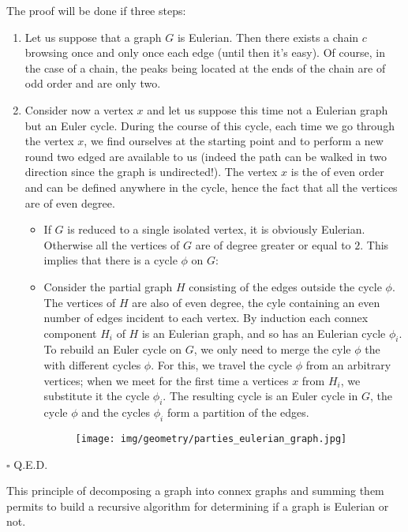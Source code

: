 {\begin{enumerate}
	\pagebreak
	\begin{dem}
	The proof will be done if three steps:
	\begin{enumerate}
		\item Let us suppose that a graph $G$ is Eulerian. Then there exists a chain $c$ browsing once and only once each edge (until then it's easy). Of course, in the case of a chain, the peaks being located at the ends of the chain are of odd order and are only two.
		
		\item Consider now a vertex $x$ and let us suppose this time not a Eulerian graph but an Euler cycle. During the course of this cycle, each time we go through the vertex $x$, we find ourselves at the starting point and to perform a new round two edged are available to us (indeed the path can be walked in two direction since the graph is undirected!). The vertex $x$ is the of even order and can be defined anywhere in the cycle, hence the fact that all the vertices are of even degree.
		
		\begin{itemize}
			\item If $G$ is reduced to a single isolated vertex, it is obviously Eulerian. Otherwise all the vertices of $G$ are of degree greater or equal to $2$. This implies that there is a cycle $\phi$ on $G$:
			
			\item Consider the partial graph $H$ consisting of the edges outside the cycle $\phi$. The vertices of $H$ are also of even degree, the cyle containing an even number of edges incident to each vertex. By induction each connex component $H_i$ of $H$ is an Eulerian graph, and so has an Eulerian cycle $\phi_i$. To rebuild an Euler cycle on $G$, we only need to merge the cyle $\phi$ the with different cycles $\phi$. For this, we travel the cycle $\phi$ from an arbitrary vertices; when we meet for the first time a vertices $x$ from $H_i$, we substitute it the cycle $\phi_i$. The resulting cycle is an Euler cycle in $G$, the cycle $\phi$ and the cycles $\phi_i$ form a partition of the edges.
			\begin{figure}[H]
				\centering
				\texttt{[image: img/geometry/parties\_eulerian\_graph.jpg]}
			\end{figure}
		\end{itemize}
	\end{enumerate}
	\begin{flushright}
		$\square$  Q.E.D.
	\end{flushright}
	\end{dem}
	\begin{tcolorbox}[title=Remark,colframe=black,arc=10pt]
	This principle of decomposing a graph into connex graphs and summing them permits to build a recursive algorithm for determining if a graph is Eulerian or not.
	\end{tcolorbox}
	

\end{enumerate}}
